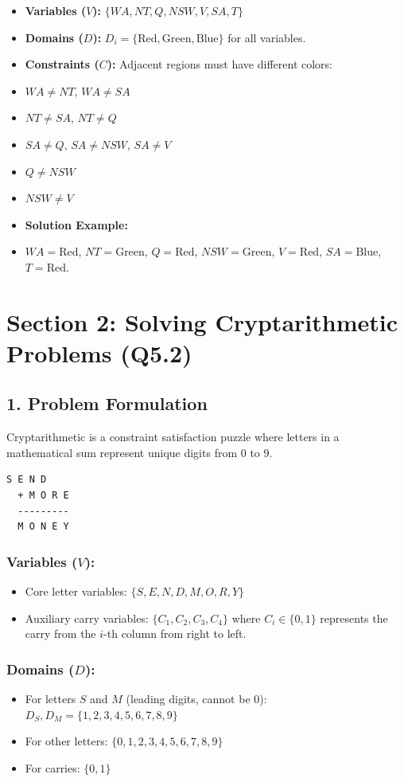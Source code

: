 \begin{itemize}
  \item   \textbf{Variables ($V$):} $\{WA, NT, Q, NSW, V, SA, T\}$
  \item   \textbf{Domains ($D$):} $D_i = \{\text{Red}, \text{Green}, \text{Blue}\}$ for all variables.
  \item   \textbf{Constraints ($C$):} Adjacent regions must have different colors:
  \item   $WA \ne NT$, $WA \ne SA$
  \item   $NT \ne SA$, $NT \ne Q$
  \item   $SA \ne Q$, $SA \ne NSW$, $SA \ne V$
  \item   $Q \ne NSW$
  \item   $NSW \ne V$
  \item   \textbf{Solution Example:}
  \item   $WA = \text{Red}$, $NT = \text{Green}$, $Q = \text{Red}$, $NSW = \text{Green}$, $V = \text{Red}$, $SA = \text{Blue}$, $T = \text{Red}$.
\end{itemize}


\section{Section 2: Solving Cryptarithmetic Problems (Q5.2)}

\subsection{1. Problem Formulation}
Cryptarithmetic is a constraint satisfaction puzzle where letters in a mathematical sum represent unique digits from $0$ to $9$.
\begin{lstlisting}
S E N D
  + M O R E
  ---------
  M O N E Y
\end{lstlisting}

\subsubsection{Variables ($V$):}
\begin{itemize}
  \item   Core letter variables: $\{S, E, N, D, M, O, R, Y\}$
  \item   Auxiliary carry variables: $\{C_1, C_2, C_3, C_4\}$ where $C_i \in \{0, 1\}$ represents the carry from the $i$-th column from right to left.
\end{itemize}

\subsubsection{Domains ($D$):}
\begin{itemize}
  \item   For letters $S$ and $M$ (leading digits, cannot be 0): $D_S, D_M = \{1, 2, 3, 4, 5, 6, 7, 8, 9\}$
  \item   For other letters: $\{0, 1, 2, 3, 4, 5, 6, 7, 8, 9\}$
  \item   For carries: $\{0, 1\}$
\end{itemize}

